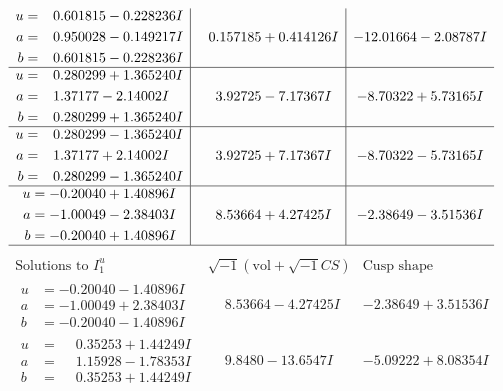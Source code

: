 \documentclass[1p]{elsarticle_modified}
\theoremstyle{definition}
\newcommand{\I}{\sqrt{-1}}
\begin{document}
$$\begin{array}{c|c|c}
\begin{aligned}
u &= \phantom{-}0.601815 - 0.228236 I \\
a &= \phantom{-}0.950028 - 0.149217 I \\
b &= \phantom{-}0.601815 - 0.228236 I\end{aligned}
 & \phantom{-}0.157185 + 0.414126 I & -12.01664 - 2.08787 I \\ \hline\begin{aligned}
u &= \phantom{-}0.280299 + 1.365240 I \\
a &= \phantom{-}1.37177 - 2.14002 I \\
b &= \phantom{-}0.280299 + 1.365240 I\end{aligned}
 & \phantom{-}3.92725 - 7.17367 I & -8.70322 + 5.73165 I \\ \hline\begin{aligned}
u &= \phantom{-}0.280299 - 1.365240 I \\
a &= \phantom{-}1.37177 + 2.14002 I \\
b &= \phantom{-}0.280299 - 1.365240 I\end{aligned}
 & \phantom{-}3.92725 + 7.17367 I & -8.70322 - 5.73165 I \\ \hline\begin{aligned}
u &= -0.20040 + 1.40896 I \\
a &= -1.00049 - 2.38403 I \\
b &= -0.20040 + 1.40896 I\end{aligned}
 & \phantom{-}8.53664 + 4.27425 I & -2.38649 - 3.51536 I\\
 \hline 
 \end{array}$$\newpage$$\begin{array}{c|c|c}  
\text{Solutions to }I^u_{1}& \I (\text{vol} + \sqrt{-1}CS) & \text{Cusp shape}\\
 \hline 
\begin{aligned}
u &= -0.20040 - 1.40896 I \\
a &= -1.00049 + 2.38403 I \\
b &= -0.20040 - 1.40896 I\end{aligned}
 & \phantom{-}8.53664 - 4.27425 I & -2.38649 + 3.51536 I \\ \hline\begin{aligned}
u &= \phantom{-}0.35253 + 1.44249 I \\
a &= \phantom{-}1.15928 - 1.78353 I \\
b &= \phantom{-}0.35253 + 1.44249 I\end{aligned}
 & \phantom{-}9.8480 - 13.6547 I & -5.09222 + 8.08354 I \\ \hline\begin{aligned}

\end{aligned}
\end{array}$$
\end{document}
